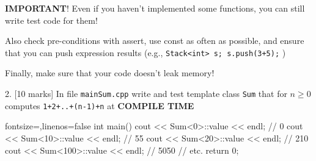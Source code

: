 \documentclass[a4paper,11pt]{article}
\begin{document}
\bigskip

\textbf{IMPORTANT}! Even if you haven't implemented some functions, you can still write
test code for them!

\bigskip

Also check pre-conditions with assert, use const as often as possible, and
ensure that you can push expression results (e.g., \texttt{Stack<int> s; s.push(3+5);} )

\bigskip

Finally, make sure that your code doesn't leak memory!

\linerule 


\bigskip

2. [10 marks] 
In file \texttt{mainSum.cpp} write and test template class \texttt{Sum} that for $n \ge 0$
computes \texttt{1+2+..+(n-1)+n} at \textbf{COMPILE TIME}
\begin{cppcode*}{fontsize=\footnotesize,linenos=false}
int main() {
    cout << Sum<0>::value  << endl;         // 0
    cout << Sum<10>::value << endl;         // 55
    cout << Sum<20>::value << endl;         // 210
    cout << Sum<100>::value << endl;        // 5050
    // etc.
    return 0;
}
\end{cppcode*}
\end{document}
